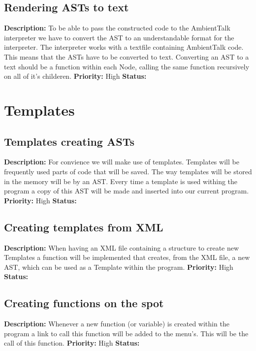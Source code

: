 \documentclass{article}
\begin{document}
\subsection{Rendering ASTs to text}
\textbf{Description: } To be able to pass the constructed code to the AmbientTalk interpreter we have to convert the AST to an understandable format for the interpreter. The 
interpreter works with a textfile containing AmbientTalk code. This means that the ASTs have to be converted to text. Converting an
AST to a text should be a function within each Node, calling the same function recursively on all of it's childeren.\newline
\textbf{Priority:} High \newline
\textbf{Status: } \newline
\section{Templates} 
\subsection{Templates creating ASTs}
\textbf{Description: } For convience we will make use of templates. Templates will be frequently used parts of code that will be saved. The way templates will be stored in the 
memory will be by an AST. Every time a template is used withing the program a copy of this AST will be made and inserted into our current program.\newline
\textbf{Priority:} High \newline
\textbf{Status: } \newline
\subsection{Creating templates from XML}
\textbf{Description: } When having an XML file containing a structure to create new Templates a function will be implemented that creates, from the XML file, a new AST, which 
can be used as a Template within the program.\newline
\textbf{Priority:} High \newline
\textbf{Status: } \newline
\subsection{Creating functions on the spot}
\textbf{Description: } Whenever a new function (or variable) is created within the program a link to call this function will be added to the menu's. This will be the call 
of this function.\newline
\textbf{Priority:} High \newline
\textbf{Status: } \newline
\end{document}
